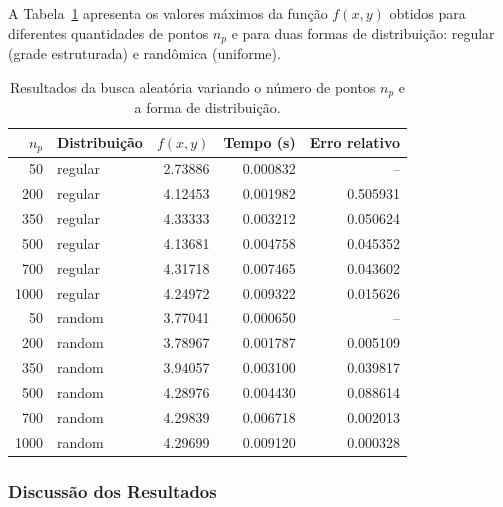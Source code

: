 \documentclass[12pt]{article}
\begin{document}
A Tabela~\ref{tab:busca_aleatoria} apresenta os valores máximos da função $f(x,y)$ obtidos para diferentes quantidades de pontos $n_p$ e para duas formas de distribuição: regular (grade estruturada) e randômica (uniforme).

\begin{table}[H]
\centering
\begin{tabular}{rlrrr}
\hline
   $n_p$ & Distribuição   & $f(x,y)$ & Tempo (s) & Erro relativo \\
\hline
         50 & regular        & 2.73886 & 0.000832 &  --         \\
        200 & regular        & 4.12453 & 0.001982 &  0.505931   \\
        350 & regular        & 4.33333 & 0.003212 &  0.050624   \\
        500 & regular        & 4.13681 & 0.004758 &  0.045352   \\
        700 & regular        & 4.31718 & 0.007465 &  0.043602   \\
       1000 & regular        & 4.24972 & 0.009322 &  0.015626   \\
         50 & random         & 3.77041 & 0.000650 &  --         \\
        200 & random         & 3.78967 & 0.001787 &  0.005109   \\
        350 & random         & 3.94057 & 0.003100 &  0.039817   \\
        500 & random         & 4.28976 & 0.004430 &  0.088614   \\
        700 & random         & 4.29839 & 0.006718 &  0.002013   \\
       1000 & random         & 4.29699 & 0.009120 &  0.000328   \\
\hline
\end{tabular}
\caption{Resultados da busca aleatória variando o número de pontos $n_p$ e a forma de distribuição.}
\label{tab:busca_aleatoria}
\end{table}

\subsubsection*{Discussão dos Resultados}
\end{document}
